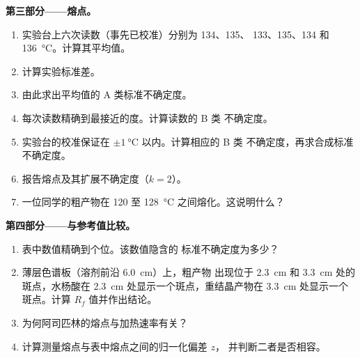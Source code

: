 \begin{problem}
\noindent\textbf{第三部分——熔点。}
\begin{enumerate}[resume]
  \item 实验台上六次读数（事先已校准）分别为 134、135、
        133、135、134 和 \qty{136}{\celsius}。计算其平均值。
  \item 计算实验标准差。
  \item 由此求出平均值的 A 类标准不确定度。
  \item 每次读数精确到最接近的度。计算读数的 B 类
        不确定度。
  \item 实验台的校准保证在
        $\pm\qty{1}{\celsius}$ 以内。计算相应的 B 类
        不确定度，再求合成标准不确定度。
  \item 报告熔点及其扩展不确定度（$k = 2$）。
  \item 一位同学的粗产物在 120 至
        \qty{128}{\celsius} 之间熔化。这说明什么？
\end{enumerate}

\noindent\textbf{第四部分——与参考值比较。}
\begin{enumerate}[resume]
  \item 表中数值精确到个位。该数值隐含的
        标准不确定度为多少？
  \item 薄层色谱板（溶剂前沿 \qty{6.0}{cm}）上，粗产物
        出现位于 \qty{2.3}{cm} 和 \qty{3.3}{cm} 处的斑点，水杨酸在
        \qty{2.3}{cm} 处显示一个斑点，重结晶产物在
        \qty{3.3}{cm} 处显示一个斑点。计算 $R_f$ 值并作出结论。
  \item 为何阿司匹林的熔点与加热速率有关？
  \item 计算测量熔点与表中熔点之间的归一化偏差 $z$，
        并判断二者是否相容。
\end{enumerate}
\end{problem}
